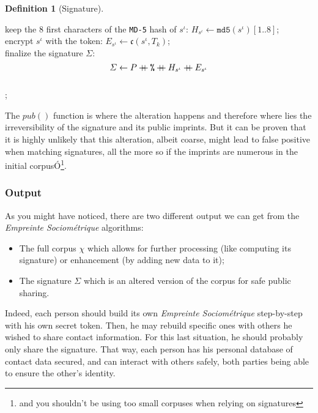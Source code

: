 \documentclass[twoside,twocolumn]{article}
\newcommand{\concat}{\mathbin{{+}\mspace{-8mu}{+}}}
\theoremstyle{definition}
\newtheorem{definition}{Definition}
\theoremstyle{remark}
\begin{document}
\begin{definition}[Signature]
\begin{algorithm}
{            \If{$i < norm{\mathcal{R}}$}{
                $s^\iota \gets s^\iota \concat \texttt{SEC\_SEP}$; \\
            }
        }
        keep the 8 first characters of the \texttt{MD-5} hash of $s^\iota$: $H_{s^\iota} \gets \texttt{md5}(s^\iota)[1..8]$; \\
        encrypt $s^\iota$ with the token: $E_{s^\iota} \gets \mathfrak{c}(s^\iota, T_k)$; \\
        finalize the signature $\varSigma$:\begin{equation}
            \label{eq:signature}
            \varSigma \gets P \concat \texttt{\%} \concat H_{s^\iota} \concat E_{s^\iota}
        \end{equation} \\
        \Return{$\varSigma$};
        \caption{Signature construction}
        \label{algo:signature}
    \end{algorithm}

    The $pub()$ function is where the alteration happens and therefore where lies the irreversibility of the signature and its public imprints.
    But it can be proven that it is highly unlikely that this alteration, albeit coarse, might lead to false positive when matching signatures, all the 
    more so if the imprints are numerous in the initial corpusÓ\footnote{and you shouldn't be using too small corpuses when relying on signatures}.
\end{definition}

\subsubsection{Output}

As you might have noticed, there are two different output we can get from the \emph{Empreinte Sociométrique} algorithms:
\begin{itemize}
    \item The full corpus $\chi$ which allows for further processing (like computing its signature) or enhancement (by adding new data to it);
    \item The signature $\varSigma$ which is an altered version of the corpus for safe public sharing.
\end{itemize}

Indeed, each person should build its own \emph{Empreinte Sociométrique} step-by-step with his own secret token. Then, he may rebuild specific ones 
with others he wished to share contact information. For this last situation, he should probably only share the signature.
That way, each person has his personal database of contact data secured, and can interact with others safely, both parties being able to ensure the 
other's identity.
\end{document}
